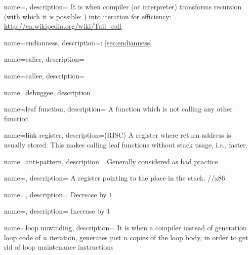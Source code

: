 {
  name=,
  description={
  {It is when compiler (or interpreter) transforms recursion (with which it is possible: ) 
  into iteration for efficiency}: \url{http://en.wikipedia.org/wiki/Tail_call}}
}

{
  name=endianness,
  description={: \ref{sec:endianness}}
}

{
  name=caller,
  description={}
}

{
  name=callee,
  description={}
}

{
  name=debuggee,
  description={}
}

{
  name=leaf function,
  description={
  {A function which is not calling any other function}}
}

{
  name=link register,
  description=(RISC) {
  {A register where return address is usually stored.
  This makes calling leaf functions without stack usage, i.e., faster.}}
}

{
  name=anti-pattern,
  description={
  {Generally considered as bad practice}}
}

{
  name=,
  description={
  {A register pointing to the place in the stack.}
  \SP/\ESP/\RSP \InENRU x86}
}

{
  name=,
  description={
  {Decrease by $1$}}
}

{
  name=,
  description={
  {Increase by $1$}}
}

{
  name=loop unwinding,
  description={
  {It is when a compiler instead of generation loop code of $n$ iteration, generates just $n$ copies of the
  loop body, in order to get rid of loop maintenance instructions}}
}

